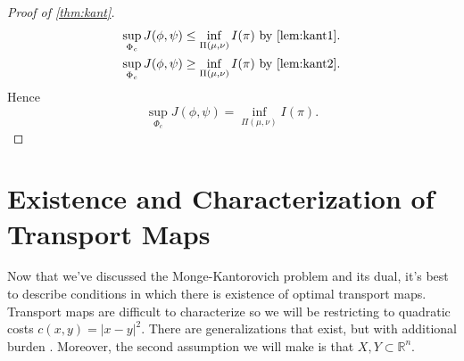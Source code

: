 \documentclass[12pt]{article}
\newcommand{\R}{\mathbb{R}}
\theoremstyle{plain}
\numberwithin{equation}{section}
\begin{document}
\begin{proof}[Proof of \autoref{thm:kant}]
  \begin{align*}
    \sup_{\Phi_c}J(\phi,\psi)\le \inf_{\Pi(\mu,\nu)}I(\pi) &\,\,\text{by \autoref{lem:kant1}}. \\
    \sup_{\Phi_c}J(\phi,\psi)\ge \inf_{\Pi(\mu,\nu)}I(\pi) &\,\,\text{by \autoref{lem:kant2}}.
  \end{align*}
  Hence
  \[ \sup_{\Phi_c}J(\phi,\psi)= \inf_{\Pi(\mu,\nu)}I(\pi).\]
\end{proof}
\section{Existence and Characterization of Transport Maps}
Now that we've discussed the Monge-Kantorovich problem and its dual, it's best to describe conditions in which there is existence of optimal transport maps. Transport maps are difficult to characterize 
so we will be restricting to quadratic costs $c(x,y)=|x-y|^2$. There are generalizations that exist, but with additional burden \cite{thorpe}. Moreover, the second assumption we will make is that $X,Y\subset \R^n$. 
\end{document}
